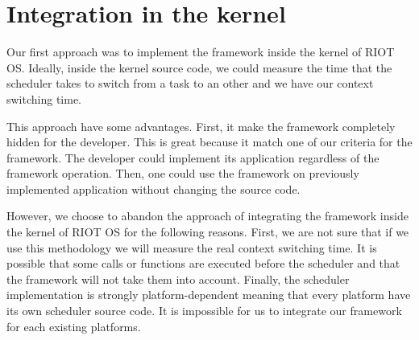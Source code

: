 \section{Integration in the kernel \label{sec:kernel}}

Our first approach was to implement the framework inside the kernel of RIOT OS.
Ideally, inside the kernel source code, we could measure the time that the scheduler takes to switch from a task to an other and we have our context switching time.

This approach have some advantages.
First, it make the framework completely hidden for the developer.
This is great because it match one of our criteria for the framework.
The developer could implement its application regardless of the framework operation.
Then, one could use the framework on previously implemented application without changing the source code.

However, we choose to abandon the approach of integrating the framework inside the kernel of RIOT OS for the following reasons.
First, we are not sure that if we use this methodology we will measure the real context switching time.
It is possible that some calls or functions are executed before the scheduler and that the framework will not take them into account.
Finally, the scheduler implementation is strongly platform-dependent meaning that every platform have its own scheduler source code.
It is impossible for us to integrate our framework for each existing platforms.